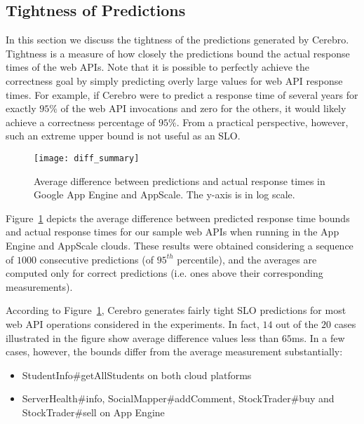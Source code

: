 \subsection{Tightness of Predictions}

In this section we discuss the tightness of the predictions generated by Cerebro. 
Tightness is a measure of how closely the predictions
bound the actual response times of the web APIs. 
Note that it is possible to perfectly achieve the correctness goal
by simply predicting overly large values for web API response times. For example, if Cerebro were to
predict a response time of several years for exactly $95\%$ of the web API
invocations and zero for the others, it would likely
achieve a correctness percentage of $95\%$.  From a practical perspective,
however, such an extreme upper bound is not useful as an SLO. 

\begin{figure}
\centering
\texttt{[image: diff\_summary]}
\caption{Average difference between predictions and actual response times in
Google App Engine and AppScale. The y-axis is in log scale.}
\label{fig:diff_summary}
\end{figure}

Figure~\ref{fig:diff_summary} depicts the average difference between predicted
response time bounds and actual response times for
our sample web APIs when running in the App Engine and AppScale clouds. 
These results were obtained considering a sequence of $1000$ 
consecutive predictions (of $95^{th}$ percentile), and the averages are
computed only for correct predictions (i.e. ones above their corresponding
measurements).

According to Figure~\ref{fig:diff_summary}, Cerebro generates fairly tight 
SLO predictions for most web API operations considered in the experiments. In fact,
$14$ out of the $20$ cases illustrated in the figure show average difference
values less than $65$ms. In a few cases, however, the bounds differ from the
average measurement substantially:
\begin{itemize}
\item StudentInfo\#getAllStudents on both cloud platforms
\item ServerHealth\#info, SocialMapper\#addComment, StockTrader\#buy and StockTrader\#sell on App Engine
\end{itemize}

